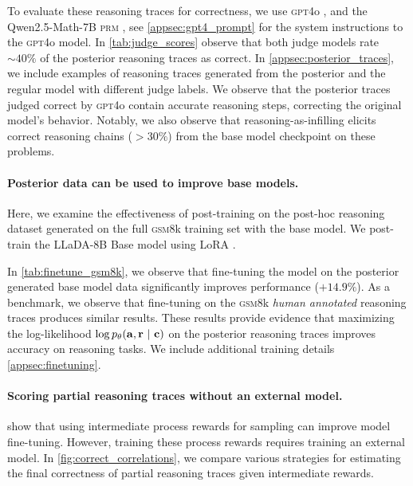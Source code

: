 To evaluate these reasoning traces for correctness, we use \textsc{gpt4}o \citep{hurst2024gpt}, and the Qwen2.5-Math-7B \textsc{prm} \citep{zhang2025lessons}, see \cref{appsec:gpt4_prompt} for the system instructions to the \textsc{gpt4}o model. In \cref{tab:judge_scores} observe that both judge models rate $\sim40\%$ of the posterior reasoning traces as correct. In \cref{appsec:posterior_traces}, we include examples of reasoning traces generated from the posterior and the regular model with different judge labels. We observe that the posterior traces judged correct by \textsc{gpt4}o contain accurate reasoning steps, correcting the original model's behavior. Notably, we also observe that {reasoning-as-infilling} elicits correct reasoning chains ($>30\%$) from the base model checkpoint on these problems. 







    


\paragraph{Posterior data can be used to improve base models.} Here, we examine the effectiveness of post-training on the post-hoc reasoning dataset generated on the full \textsc{gsm8}k training set with the base model. We post-train the LLaDA-8B Base model using LoRA \citep{hu2022lora}. 

In \cref{tab:finetune_gsm8k}, we observe that fine-tuning the model on the posterior generated base model data significantly improves performance ($+14.9\%$).
As a benchmark, we observe that fine-tuning on the \textsc{gsm8}k \textit{human annotated} reasoning traces produces similar results. These results provide evidence that maximizing the log-likelihood $\log p_\theta(\mathbf{a}, \mathbf{r} ~\vert~ \mathbf{c})$ on the posterior reasoning traces improves accuracy on reasoning tasks. We include additional training details \cref{appsec:finetuning}. 



\paragraph{Scoring partial reasoning traces without an external model.} 
\citet{zhang2024rest} show that using intermediate process rewards for sampling can improve model fine-tuning. However, training these process rewards requires training an external model. In \cref{fig:correct_correlations}, we compare various strategies for estimating the final correctness of partial reasoning traces given intermediate rewards. 

